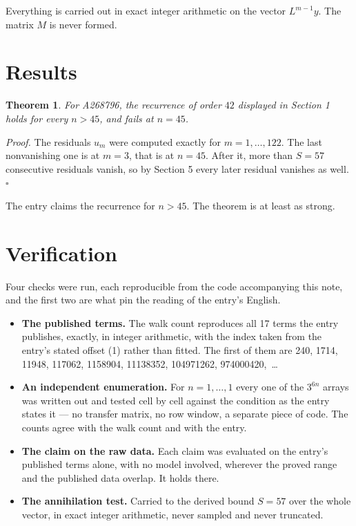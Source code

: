 \documentclass[11pt]{article}
\newtheorem{theorem}{Theorem}
\theoremstyle{definition}
\begin{document}
Everything is carried out in exact integer arithmetic on the vector $L^{m-1}y$. The matrix $M$ is never formed.

\section{Results}

\begin{theorem} For A268796, the recurrence of order $42$ displayed in Section 1 holds for every $n > 45$, and fails at $n = 45$.\end{theorem}

{\itshape Proof.} The residuals $u_m$ were computed exactly for $m = 1,\dots,122$. The last nonvanishing one is at $m = 3$, that is at $n = 45$. After it, more than $S = 57$ consecutive residuals vanish, so by Section 5 every later residual vanishes as well. $\square$

The entry claims the recurrence for $n > 45$. The theorem is at least as strong.

\section{Verification}

Four checks were run, each reproducible from the code accompanying this note, and the first two are what pin the reading of the entry's English.

\begin{itemize}

\item {\bfseries The published terms.} The walk count reproduces all 17 terms the entry publishes, exactly, in integer arithmetic, with the index taken from the entry's stated offset (1) rather than fitted. The first of them are 240, 1714, 11948, 117062, 1158904, 11138352, 104971262, 974000420,~\dots

\item {\bfseries An independent enumeration.} For $n = 1,\dots,1$ every one of the $3^{6n}$ arrays was written out and tested cell by cell against the condition as the entry states it --- no transfer matrix, no row window, a separate piece of code. The counts agree with the walk count and with the entry.

\item {\bfseries The claim on the raw data.} Each claim was evaluated on the entry's published terms alone, with no model involved, wherever the proved range and the published data overlap. It holds there.

\item {\bfseries The annihilation test.} Carried to the derived bound $S = 57$ over the whole vector, in exact integer arithmetic, never sampled and never truncated.

\end{itemize}
\end{document}
